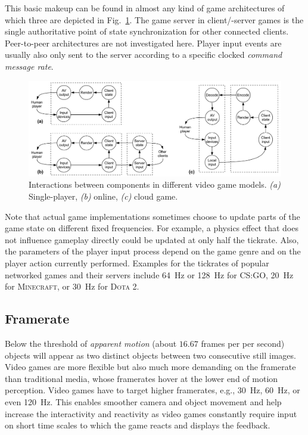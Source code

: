 This basic makeup can be found in almost any kind of game architectures of which three are depicted in Fig.~\ref{fig:component-models}. The game server in client/-server games is the single authoritative point of state synchronization for other connected clients. Peer-to-peer architectures are not investigated here. Player input events are usually also only sent to the server according to a specific clocked \textit{command message rate}.

\begin{figure}[!t]
  \centering
  \includegraphics[width=0.9\columnwidth]{../../../models/component_interaction_full.pdf}
  \caption{Interactions between components in different video game models. \textit{(a)} Single-player, \textit{(b)} online, \textit{(c)} cloud game.}
  \label{fig:component-models}
\end{figure}

Note that actual game implementations sometimes choose to update parts of the game state on different fixed frequencies. For example, a physics effect that does not influence gameplay directly could be updated at only half the tickrate. Also, the parameters of the player input process depend on the game genre and on the player action currently performed. Examples for the tickrates of popular networked games and their servers include \SI{64}{\hertz} or \SI{128}{\hertz} for \textsc{CS:GO}, \SI{20}{\hertz} for \textsc{Minecraft}, or \SI{30}{\hertz} for \textsc{Dota 2}.


\subsection{Framerate}
\label{sec:framerate}


Below the threshold of \textit{apparent motion} (about $16.67$ frames per per second) objects will appear as two distinct objects between two consecutive still images. Video games are more flexible but also much more demanding on the framerate than traditional media, whose framerates hover at the lower end of motion perception. Video games have to target higher framerates, e.g., \SI{30}{\hertz}, \SI{60}{\hertz}, or even \SI{120}{\hertz}. This enables smoother camera and object movement and help increase the interactivity and reactivity as video games constantly require input on short time scales to which the game reacts and displays the feedback.


